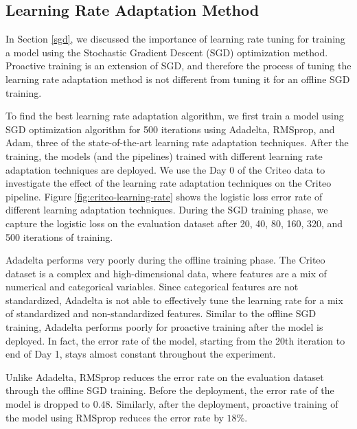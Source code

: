 \subsection{Learning Rate Adaptation Method}
In Section \ref{sgd}, we discussed the importance of learning rate tuning for training a model using the Stochastic Gradient Descent (SGD) optimization method.
Proactive training is an extension of SGD, and therefore the process of tuning the learning rate adaptation method is not different from tuning it for an offline SGD training.

To find the best learning rate adaptation algorithm, we first train a model using SGD optimization algorithm for 500 iterations using Adadelta, RMSprop, and Adam, three of the state-of-the-art learning rate adaptation techniques.
After the training, the models (and the pipelines) trained with different learning rate adaptation techniques are deployed.
We use the Day 0 of the Criteo data to investigate the effect of the learning rate adaptation techniques on the Criteo pipeline.
Figure \ref{fig:criteo-learning-rate} shows the logistic loss error rate of different learning adaptation techniques. 
During the SGD training phase, we capture the logistic loss on the evaluation dataset after 20, 40, 80, 160, 320, and 500 iterations of training.



Adadelta performs very poorly during the offline training phase.
The Criteo dataset is a complex and high-dimensional data, where features are a mix of numerical and categorical variables.
Since categorical features are not standardized, Adadelta is not able to effectively tune the learning rate for a mix of standardized and non-standardized features.
Similar to the offline SGD training, Adadelta performs poorly for proactive training after the model is deployed.
In fact, the error rate of the model, starting from the 20th iteration to end of Day 1, stays almost constant throughout the experiment.

Unlike Adadelta, RMSprop reduces the error rate on the evaluation dataset through the offline SGD training.
Before the deployment, the error rate of the model is dropped to $0.48$.
Similarly, after the deployment, proactive training of the model using RMSprop reduces the error rate by $18\%$.

